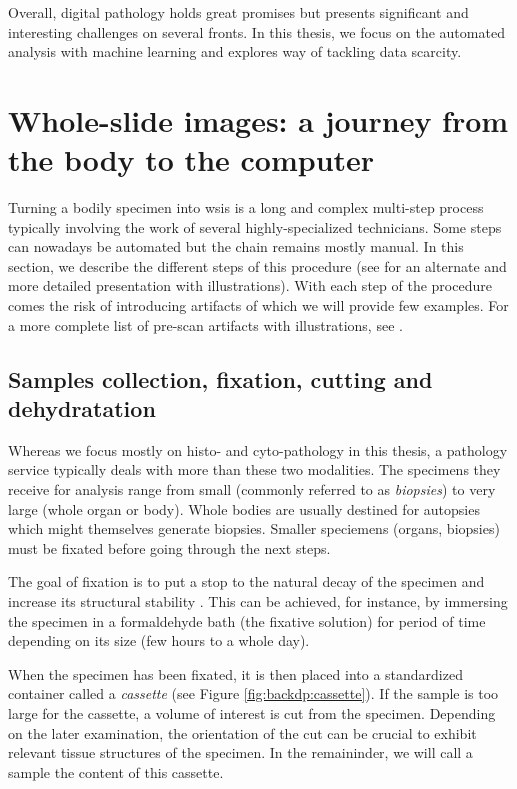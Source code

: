 Overall, digital pathology holds great promises but presents significant and interesting challenges on several fronts. In this thesis, we focus on the automated analysis with machine learning and explores way of tackling data scarcity.

\section{Whole-slide images: a journey from the body to the computer}
\label{sec:backdp:wsi}

Turning a bodily specimen into \acrlong{wsi}s is a long and complex multi-step process typically involving the work of several highly-specialized technicians. Some steps can nowadays be automated but the chain remains mostly manual. In this section, we describe the different steps of this procedure (see \parencite{mccann2014automated} for an alternate and more detailed presentation with illustrations). With each step of the procedure comes the risk of introducing artifacts of which we will provide few examples. For a more complete list of pre-scan artifacts with illustrations, see \parencite{taqi2018review}. 

\subsection{Samples collection, fixation, cutting and dehydratation}

Whereas we focus mostly on histo- and cyto-pathology in this thesis, a pathology service typically deals with more than these two modalities. The specimens they receive for analysis range from small (commonly referred to as \textit{biopsies}) to very large (whole organ or body). Whole bodies are usually destined for autopsies which might themselves generate biopsies. Smaller speciemens (organs, biopsies) must be fixated before going through the next steps. 

The goal of fixation is to put a stop to the natural decay of the specimen and increase its structural stability \parencite{rolls2012process}. This can be achieved, for instance, by immersing the specimen in a formaldehyde bath (\ie the fixative solution) for period of time depending on its size (\ie few hours to a whole day). 

When the specimen has been fixated, it is then placed into a standardized container called a \textit{cassette} (see Figure \ref{fig:backdp:cassette}). If the sample is too large for the cassette, a volume of interest is cut from the specimen. Depending on the later examination, the orientation of the cut can be crucial to exhibit relevant tissue structures of the specimen. In the remaininder, we will call a sample the content of this cassette.

